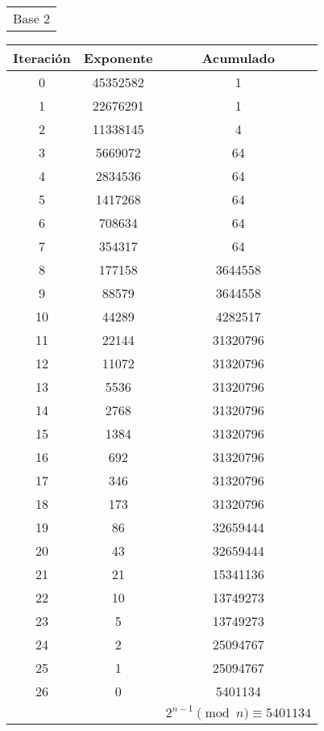 \documentclass[fleqn]{article}
\begin{document}
    \begin{center}
        \begin{tabular}{c}
            Base 2 \\
        \end{tabular}
        \begin{tabular}{c | c | c}
            Iteración & Exponente & Acumulado \\ \hline
            0 & 45352582 & 1 \\
            1 & 22676291 & 1 \\
            2 & 11338145 & 4 \\
            3 & 5669072 & 64 \\
            4 & 2834536 & 64 \\
            5 & 1417268 & 64 \\
            6 & 708634 & 64 \\
            7 & 354317 & 64 \\
            8 & 177158 & 3644558 \\
            9 & 88579 & 3644558 \\
            10 & 44289 & 4282517 \\
            11 & 22144 & 31320796 \\
            12 & 11072 & 31320796 \\
            13 & 5536 & 31320796 \\
            14 & 2768 & 31320796 \\
            15 & 1384 & 31320796 \\
            16 & 692 & 31320796 \\
            17 & 346 & 31320796 \\
            18 & 173 & 31320796 \\
            19 & 86 & 32659444 \\
            20 & 43 & 32659444 \\
            21 & 21 & 15341136 \\
            22 & 10 & 13749273 \\
            23 & 5 & 13749273 \\
            24 & 2 & 25094767 \\
            25 & 1 & 25094767 \\
            26 & 0 & 5401134 \\ \hline
            && $ 2^{n-1} \pmod{n} \equiv  5401134 $
        \end{tabular}
        \newpage
        \begin{tabular}{c}

\end{tabular}
\end{center}
\end{document}
